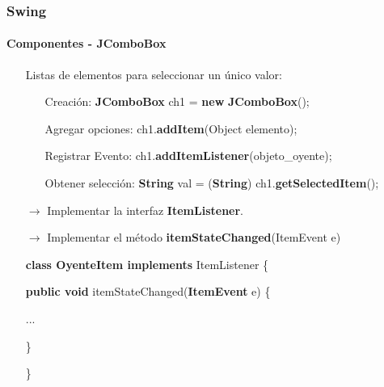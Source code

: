 \documentclass{beamer}
\begin{document}
    \begin{frame}
		\frametitle{Swing}
		\framesubtitle{Componentes - JComboBox}

        \begin{itemize}
		    \item[\checkmark] Listas de elementos para seleccionar un \'unico valor:
		    \begin{itemize}
        		    \item[] Creaci\'on: \textbf{JComboBox} ch1 = \textbf{new} \textbf{JComboBox}();
        		    \item[] Agregar opciones: ch1.\textbf{addItem}(Object elemento);
        		    \item[] Registrar Evento: ch1.\textbf{addItemListener}(objeto\_oyente);
        		    \item[] Obtener selecci\'on: \textbf{String} val = (\textbf{String}) ch1.\textbf{getSelectedItem}();
	    	    \end{itemize}
	    	    \item[$\rightarrow$] Implementar la interfaz \textbf{ItemListener}.
	    	    \item[$\rightarrow$] Implementar el m\'etodo \textbf{itemStateChanged}(ItemEvent e)
	    	    \item[] \textbf{class OyenteItem implements} ItemListener \{
	    	    \item[] \hspace{10pt} \textbf{public void} itemStateChanged(\textbf{ItemEvent} e) \{
            \item[] \hspace{10pt} ...	    	    
            \item[] \hspace{10pt}\}
            \item[] \}
		\end{itemize}
        
	\end{frame}	
\end{document}
